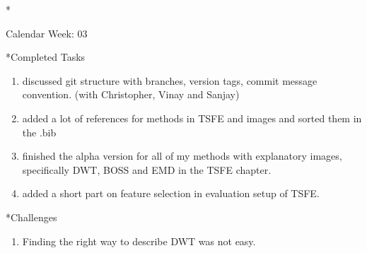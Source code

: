 \documentclass[11pt,a4paper]{article}
\begin{document}
\newpage
\begin{section}*{Calendar Week: 03 \hfill \date{22 January, 2021}}
	
	\begin{subsection}*{Completed Tasks}
		\begin{enumerate}
			\item discussed git structure with branches, version tags, commit message convention. (with Christopher, Vinay and Sanjay)
			\item added a lot of references for methods in TSFE and images and sorted them in the .bib
			\item finished the alpha version for all of my methods with explanatory images, specifically DWT, BOSS and EMD in the TSFE chapter.
			\item added a short part on feature selection in evaluation setup of TSFE.
		\end{enumerate}
	\end{subsection}
	
	\begin{subsection}*{Challenges}
		\begin{enumerate}
			\item Finding the right way to describe DWT was not easy.
		\end{enumerate}
	\end{subsection}
	
\end{section}
\end{document}
